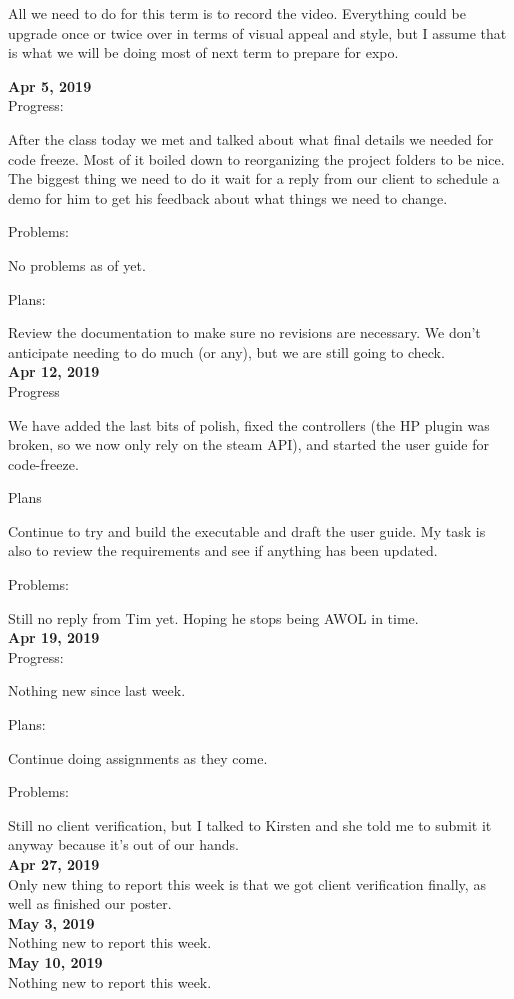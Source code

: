 All we need to do for this term is to record the video. Everything could be upgrade once or twice over in terms of visual appeal and style, but I assume that is what we will be doing most of next term to prepare for expo.


\textbf{Apr 5, 2019}\\
Progress:

After the class today we met and talked about what final details we needed for code freeze. Most of it boiled down to reorganizing the project folders to be nice. The biggest thing we need to do it wait for a reply from our client to schedule a demo for him to get his feedback about what things we need to change.

Problems:

No problems as of yet.

Plans:

Review the documentation to make sure no revisions are necessary. We don't anticipate needing to do much (or any), but we are still going to check.\\

\textbf{Apr 12, 2019}\\
Progress

We have added the last bits of polish, fixed the controllers (the HP plugin was broken, so we now only rely on the steam API), and started the user guide for code-freeze.

Plans

Continue to try and build the executable and draft the user guide. My task is also to review the requirements and see if anything has been updated.

 
Problems:

Still no reply from Tim yet. Hoping he stops being AWOL in time.\\

\textbf{Apr 19, 2019}\\
Progress:

Nothing new since last week.

Plans:

Continue doing assignments as they come.

Problems:

Still no client verification, but I talked to Kirsten and she told me to submit it anyway because it's out of our hands.\\

\textbf{Apr 27, 2019}\\
Only new thing to report this week is that we got client verification finally, as well as finished our poster. \\

\textbf{May 3, 2019}\\
Nothing new to report this week.\\

\textbf{May 10, 2019}\\
Nothing new to report this week.\\